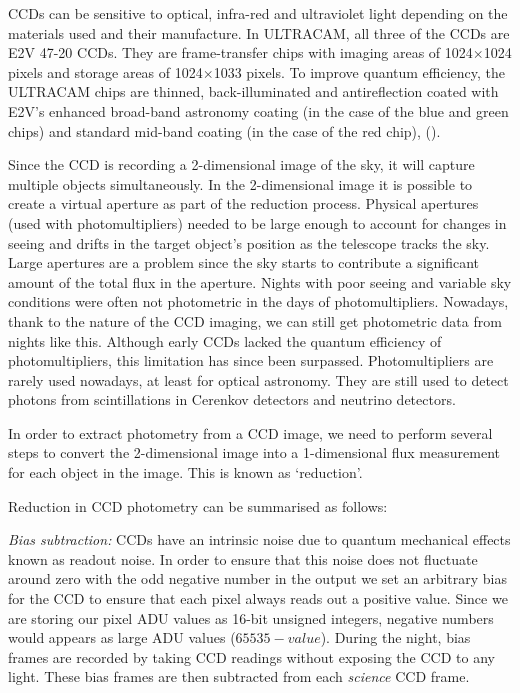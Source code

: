CCDs can be sensitive to optical, infra-red and ultraviolet light depending on the materials used and their manufacture. In ULTRACAM, all three of the CCDs are E2V 47-20 CCDs. They are frame-transfer chips with imaging areas of 1024$\times$1024 pixels and storage areas of 1024$\times$1033 pixels.  To improve quantum efficiency, the ULTRACAM chips are thinned, back-illuminated and antireflection coated with E2V's enhanced broad-band astronomy coating (in the case of the blue and green chips) and standard mid-band coating (in the case of the red chip), (\cite{dhillon07}).

Since the CCD is recording a 2-dimensional image of the sky, it will capture multiple objects simultaneously. In the 2-dimensional image it is possible to create a virtual aperture as part of the reduction process. Physical apertures (used with photomultipliers) needed to be large enough to account for changes in seeing and drifts in the target object's position as the telescope tracks the sky. Large apertures are a problem since the sky starts to contribute a significant amount of the total flux in the aperture. Nights with poor seeing and variable sky conditions were often not photometric in the days of photomultipliers. Nowadays, thank to the nature of the CCD imaging, we can still get photometric data from nights like this.  Although early CCDs lacked the quantum efficiency of photomultipliers, this limitation has since been surpassed. Photomultipliers are rarely used nowadays, at least for optical astronomy. They are still used to detect photons from scintillations in Cerenkov detectors and neutrino detectors.  

In order to extract photometry from a CCD image, we need to perform several steps to convert the 2-dimensional image into a 1-dimensional flux measurement for each object in the image. This is known as `reduction'. 

Reduction in CCD photometry can be summarised as follows: 

\emph{Bias subtraction:}
CCDs have an intrinsic noise due to quantum mechanical effects known as readout noise. In order to ensure that this noise does not fluctuate around zero with the odd negative number in the output we set an arbitrary bias for the CCD to ensure that each pixel always reads out a positive value. Since we are storing our pixel ADU values as 16-bit unsigned integers, negative numbers would appears as large ADU values ($65535 - value$). During the night, bias frames are recorded by taking CCD readings without exposing the CCD to any light. These bias frames are then subtracted from each \emph{science} CCD frame. 

